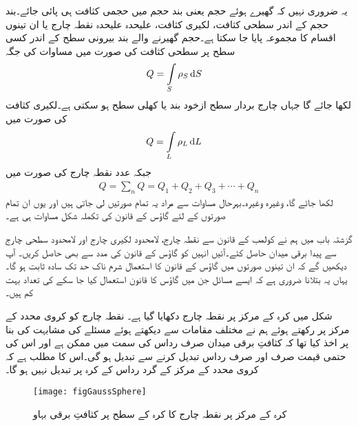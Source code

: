 یہ ضروری نہیں کہ گھیرے ہوئے حجم یعنی بند حجم میں حجمی کثافت ہی پائی جائے۔بند حجم کے اندر  سطحی کثافت، لکیری کثافت، علیحدہ علیحدہ نقطہ چارج یا ان تینوں اقسام کا مجموعہ پایا جا سکتا ہے۔حجم گھیرنے والے بند بیرونی سطح کے اندر کسی سطح پر  سطحی کثافت کی صورت میں مساوات  کی جگہ
\begin{align}
Q&=\int\limits_{S} \rho_S \dif S
\end{align}
لکھا جائے گا جہاں چارج بردار سطح ازخود بند یا کھلی سطح ہو سکتی ہے۔لکیری کثافت کی صورت میں
\begin{align}
Q&=\int\limits_{L} \rho_L \dif L
\end{align}
جبکہ   عدد نقطہ چارج کی صورت میں
\begin{align}
Q=\sum_n Q= Q_1+Q_2+Q_3+\cdots+Q_n
\end{align}
لکھا جائے گا، وغیرہ وغیرہ۔بہرحال مساوات  سے مراد یہ تمام صورتیں لی جاتی ہیں اور یوں ان تمام صورتوں کے لئے گاؤس کے  قانون کی تکملہ شکل مساوات  ہی ہے۔


گزشتہ باب میں ہم نے کولمب کے قانون سے نقطہ چارج، لامحدود  لکیری چارج اور لامحدود سطحی چارج  سے پیدا برقی میدان حاصل کئے۔آئیں انہیں کو  گاؤس کے قانون کی مدد سے بھی حاصل کریں۔ آپ دیکھیں گے کہ ان تینوں صورتوں میں گاؤس کے قانون کا استعمال شرم ناک حد تک سادہ ثابت ہو گا۔یہاں یہ بتلانا ضروری ہے کہ ایسے  مسائل جن میں گاؤس کا قانون استعمال کیا جا سکے کی تعداد  بہت کم ہیں۔

شکل  میں کرہ کے مرکز پر نقطہ چارج دکھایا گیا ہے۔ نقطہ چارج کو کروی محدد کے مرکز پر رکھتے ہوئے ہم  نے مختلف مقامات سے دیکھتے ہوئے مسئلے کی مشابہت کی بنا پر اخذ کیا تھا کہ کثافتِ برقی میدان صرف رداس کی سمت میں ممکن ہے اور اس  کی حتمی قیمت صرف اور صرف رداس  تبدیل کرنے سے تبدیل ہو گی۔اس کا مطلب ہے کہ کروی محدد کے مرکز کے گرد رداس  کے کرہ  پر  تبدیل نہیں ہو گا۔
\begin{figure}
\centering
\texttt{[image: figGaussSphere]}
\caption{کرہ کے مرکز پر نقطہ چارج کا کرہ کے سطح پر کثافتِ برقی بہاو}
\label{شکل_گاؤس_کرہ_کی_سطح_پر_مرکز_کے_نقطہ_چرج_کا_میدان}
\end{figure}

